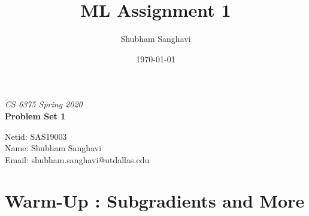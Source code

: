 \documentclass[12pt,fleqn]{exam}
\title{ML Assignment 1}
\author{Shubham Sanghavi}
\date{\today}
\begin{document}
   \begin{flushleft}
      \textit{CS 6375 Spring 2020}\\
      \Large\textbf{Problem Set 1}\\
   \end{flushleft}

\begin{flushleft}
Netid: SAS19003\\
Name: Shubham Sanghavi\\
Email: shubham.sanghavi@utdallas.edu\\
\end{flushleft}


\section*{Warm-Up : Subgradients and More}
\end{document}
